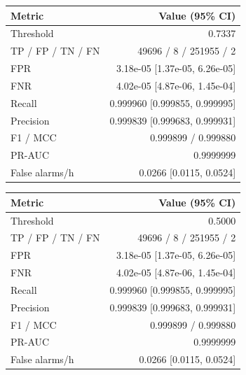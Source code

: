 \begin{tabular}{lr}
\toprule
Metric & Value (95\% CI)\\
\midrule
Threshold & 0.7337\\
TP / FP / TN / FN & 49696 / 8 / 251955 / 2\\
FPR & 3.18e-05 [1.37e-05, 6.26e-05]\\
FNR & 4.02e-05 [4.87e-06, 1.45e-04]\\
Recall & 0.999960 [0.999855, 0.999995]\\
Precision & 0.999839 [0.999683, 0.999931]\\
F1 / MCC & 0.999899 / 0.999880\\
PR-AUC & 0.9999999\\
False alarms/h & 0.0266 [0.0115, 0.0524]\\
\bottomrule
\end{tabular}

\begin{tabular}{lr}
\toprule
Metric & Value (95\% CI)\\
\midrule
Threshold & 0.5000\\
TP / FP / TN / FN & 49696 / 8 / 251955 / 2\\
FPR & 3.18e-05 [1.37e-05, 6.26e-05]\\
FNR & 4.02e-05 [4.87e-06, 1.45e-04]\\
Recall & 0.999960 [0.999855, 0.999995]\\
Precision & 0.999839 [0.999683, 0.999931]\\
F1 / MCC & 0.999899 / 0.999880\\
PR-AUC & 0.9999999\\
False alarms/h & 0.0266 [0.0115, 0.0524]\\
\bottomrule
\end{tabular}
